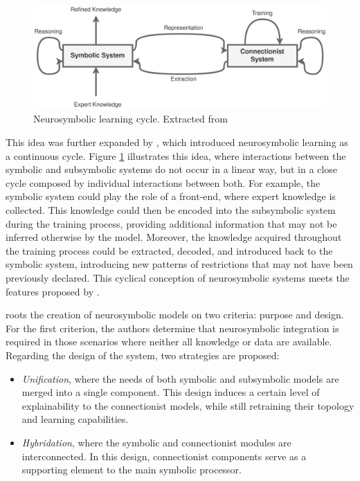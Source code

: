 \begin{figure}
    \centering
    \includegraphics[width=\linewidth]{2_stateoftheart/figures/Neurosymbolic_Bader.eps}
    \caption{Neurosymbolic learning cycle. Extracted from \cite{bader_dimensions_2005}}
    \label{fig:neuro_cycle}
\end{figure}

This idea was further expanded by \cite{bader_dimensions_2005}, which introduced neurosymbolic learning as a continuous cycle. Figure \ref{fig:neuro_cycle} illustrates this idea, where interactions between the symbolic and subsymbolic systems do not occur in a linear way, but in a close cycle composed by individual interactions between both. For example, the symbolic system could play the role of a front-end, where expert knowledge is collected. This knowledge could then be encoded into the subsymbolic system during the training process, providing additional information that may not be inferred otherwise by the model. Moreover, the knowledge acquired throughout the training process could be extracted, decoded, and introduced back to the symbolic system, introducing new patterns of restrictions that may not have been previously declared. This cyclical conception of neurosymbolic systems meets the features proposed by \cite{mcgarry_hybrid_1999}.

\cite{mira_neurosymbolic_2004} roots the creation of neurosymbolic models on two criteria: purpose and design. For the first criterion, the authors determine that neurosymbolic integration is required in those scenarios where neither all knowledge or data are available. Regarding the design of the system, two strategies are proposed:
\begin{itemize}
    \item \textit{Unification}, where the needs of both symbolic and subsymbolic models are merged into a single component. This design induces a certain level of explainability to the connectionist models, while still retraining their topology and learning capabilities.
    
    \item \textit{Hybridation}, where the symbolic and connectionist modules are interconnected. In this design, connectionist components serve as a supporting element to the main symbolic processor.
\end{itemize}

